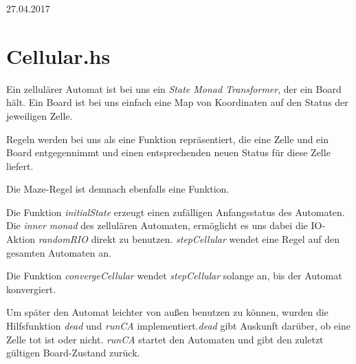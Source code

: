 \documentclass{rp}
\begin{document}


{27.04.2017} %

\section*{Cellular.hs}
Ein zellulärer Automat ist bei uns ein \textit{State Monad Transformer}, der ein Board hält. Ein Board ist bei uns einfach eine Map von Koordinaten auf den Status der jeweiligen Zelle.

Regeln werden bei uns als eine Funktion repräsentiert, die eine Zelle und ein Board entgegennimmt und einen entsprechenden neuen Status für diese Zelle liefert. 

Die Maze-Regel ist demnach ebenfalls eine Funktion.

Die Funktion \textit{initialState} erzeugt einen zufälligen Anfangsstatus des Automaten. Die \textit{inner monad} des zellulären Automaten, ermöglicht es uns dabei die IO-Aktion \textit{randomRIO} direkt zu benutzen.
\newpage
\textit{stepCellular} wendet eine Regel auf den gesamten Automaten an.

Die Funktion \textit{convergeCellular} wendet \textit{stepCellular} solange an, bis der Automat konvergiert. 

Um später den Automat leichter von außen benutzen zu können, wurden die Hilfsfunktion \textit{dead} und \textit{runCA} implementiert.\textit{dead} gibt Auskunft darüber, ob eine Zelle tot ist oder nicht. \textit{runCA} startet den Automaten und gibt den zuletzt gültigen Board-Zustand zurück. 
\end{document}
